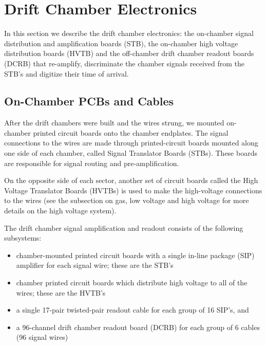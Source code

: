 \section{Drift Chamber Electronics}
In this section we describe the drift chamber electronics:
the on-chamber signal distribution and amplification boards (STB),
the on-chamber high voltage distribution boards (HVTB) and the
off-chamber drift chamber readout boards (DCRB) that re-amplify,
discriminate the chamber signals received from the STB's and
digitize their time of arrival.  

\subsection{On-Chamber PCBs and Cables}
After the drift chambers were built and the wires strung, we mounted
on-chamber printed circuit boards onto the chamber endplates.
The signal connections to the wires are made through printed-circuit 
boards mounted along one side of each chamber, called Signal Translator 
Boards (STBs).  These boards are responsible for signal routing and 
pre-amplification.  

On the opposite side of each sector, another set of 
circuit boards called the High Voltage Translator Boards (HVTBs) is used 
to make the high-voltage connections to the wires (see the subsection
on gas, low voltage and high voltage for more details on the high
voltage system).

The drift chamber signal amplification and readout consists of the 
following subsystems:
\begin{itemize}
\item  chamber-mounted printed circuit boards with a single in-line package
(SIP) amplifier for each signal wire; these are the STB's
\item  chamber printed circuit boards which distribute high voltage
to all of the wires; these are the HVTB's
\item a single 17-pair twisted-pair readout cable for each group of 16
SIP's, and
\item a 96-channel drift chamber readout board (DCRB) for each group
of 6 cables (96 signal wires)
\end{itemize}


